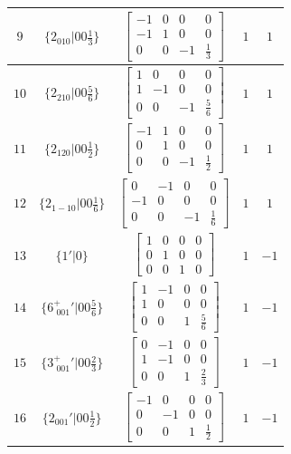 \documentclass[fleqn,8pt]{jsarticle}
\begin{document}
\begin{longtable}{ccccc}
$ 9 $ & $ \{2{}_{010}|0 0 \frac{1}{3}\} $ & $ \begin{bmatrix} -1 & 0 & 0 & 0 \\ -1 & 1 & 0 & 0 \\ 0 & 0 & -1 & \frac{1}{3} \end{bmatrix} $ & $ 1 $ & $ 1 $ \\ \hline
$ 10 $ & $ \{2{}_{210}|0 0 \frac{5}{6}\} $ & $ \begin{bmatrix} 1 & 0 & 0 & 0 \\ 1 & -1 & 0 & 0 \\ 0 & 0 & -1 & \frac{5}{6} \end{bmatrix} $ & $ 1 $ & $ 1 $ \\ \hline
$ 11 $ & $ \{2{}_{120}|0 0 \frac{1}{2}\} $ & $ \begin{bmatrix} -1 & 1 & 0 & 0 \\ 0 & 1 & 0 & 0 \\ 0 & 0 & -1 & \frac{1}{2} \end{bmatrix} $ & $ 1 $ & $ 1 $ \\ \hline
$ 12 $ & $ \{2{}_{1-10}|0 0 \frac{1}{6}\} $ & $ \begin{bmatrix} 0 & -1 & 0 & 0 \\ -1 & 0 & 0 & 0 \\ 0 & 0 & -1 & \frac{1}{6} \end{bmatrix} $ & $ 1 $ & $ 1 $ \\ \hline
$ 13 $ & $ \{1{}'|0\} $ & $ \begin{bmatrix} 1 & 0 & 0 & 0 \\ 0 & 1 & 0 & 0 \\ 0 & 0 & 1 & 0 \end{bmatrix} $ & $ 1 $ & $ -1 $ \\ \hline
$ 14 $ & $ \{6^{+}_{\,\,001}{}'|0 0 \frac{5}{6}\} $ & $ \begin{bmatrix} 1 & -1 & 0 & 0 \\ 1 & 0 & 0 & 0 \\ 0 & 0 & 1 & \frac{5}{6} \end{bmatrix} $ & $ 1 $ & $ -1 $ \\ \hline
$ 15 $ & $ \{3^{+}_{\,\,001}{}'|0 0 \frac{2}{3}\} $ & $ \begin{bmatrix} 0 & -1 & 0 & 0 \\ 1 & -1 & 0 & 0 \\ 0 & 0 & 1 & \frac{2}{3} \end{bmatrix} $ & $ 1 $ & $ -1 $ \\ \hline
$ 16 $ & $ \{2{}_{001}{}'|0 0 \frac{1}{2}\} $ & $ \begin{bmatrix} -1 & 0 & 0 & 0 \\ 0 & -1 & 0 & 0 \\ 0 & 0 & 1 & \frac{1}{2} \end{bmatrix} $ & $ 1 $ & $ -1 $ \\ \hline

\end{longtable}
\end{document}
